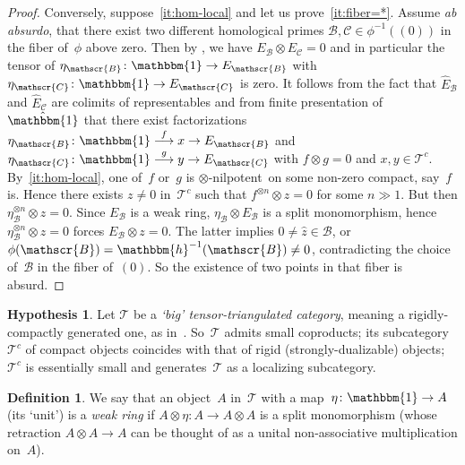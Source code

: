 \documentclass[10pt,a4paper]{article}
\def\To#1{\mathchoice{\xrightarrow{\textstyle\kern4pt#1\kern3pt}}{\stackrel{#1}{\longrightarrow}}{}{}}
\numberwithin{equation}{section}
\theoremstyle{definition}
\newtheorem{Def}[equation]{Definition}
\newtheorem{Hyp}[equation]{Hypothesis}
\newcommand{\cat}[1]{\mathscr{#1}}
\newcommand{\inv}{^{-1}}
\let\xto\To
\newcommand{\unit}{\mathbbm{1}}
\newcommand{\ababs}{\textit{ab absurdo}}
\newcommand{\cB}{\cat{B}}
\newcommand{\cC}{\cat{C}}
\newcommand{\cT}{\cat{T}}
\newcommand{\EB}{E_{\cB}}
\newcommand{\EC}{E_{\cC}}
\newcommand{\hEB}{\hat E_{\cB}}
\newcommand{\hEC}{\hat E_{\cC}}
\newcommand{\hunit}{\hat\unit}
\newcommand{\potimes}[1]{^{\otimes #1}}
\newcommand{\tensnil}{$\otimes$\nobreakdash-nilpotent}
\newcommand{\yoneda}{\mathbbm{h}}
\begin{document}
\begin{proof}
Conversely, suppose~\eqref{it:hom-local} and let us prove~\eqref{it:fiber=*}. Assume \ababs, that there exist two different homological primes $\cB,\cC\in\phi\inv((0))$ in the fiber of~$\phi$ above zero. Then by \cite[Prop.\,5.3]{Balmer20a}, we have $\EB\otimes \EC=0$ and in particular the tensor of $\eta_\cB\colon \unit\to \EB$ with $\eta_\cC\colon \unit \to \EC$ is zero. It follows from the fact that $\hEB$ and $\hEC$ are colimits of representables and from finite presentation of~$\hunit$ that there exist factorizations $\eta_\cB\colon \unit\xto{f} x\to \EB$ and $\eta_\cC\colon \unit\xto{g} y\to \EC$ with $f\otimes g=0$ and $x,y\in\cT^c$. By~\eqref{it:hom-local}, one of~$f$ or~$g$ is \tensnil\ on some non-zero compact, say~$f$ is. Hence there exists $z\neq0$ in~$\cT^c$ such that $f\potimes{n}\otimes z=0$ for some $n\gg1$. But then $\eta_\cB\potimes{n}\otimes z=0$. Since $\EB$ is a weak ring, $\eta_\cB\otimes\EB$ is a split monomorphism, hence $\eta_\cB\potimes{n}\otimes z=0$ forces $\EB\otimes z=0$. The latter implies $0\neq\hat z\in \cB$, or $\phi(\cB)=\yoneda\inv(\cB)\neq 0$, contradicting the choice of~$\cB$ in the fiber of~$(0)$. So the existence of two points in that fiber is absurd.
\end{proof}

\begin{Hyp}
\label{Hyp:big-tt}
Let $\cT$ be a \emph{`big' tensor-triangulated category}, meaning a rigidly-compactly generated one, as in~\cite{BalmerFavi11}. So~$\cT$ admits small coproducts; its subcategory~$\cT^c$ of compact objects coincides with that of rigid (strongly-dualizable) objects; $\cT^c$ is essentially small and generates~$\cT$ as a localizing subcategory.
\end{Hyp}

\begin{Def}
\label{Def:weak-ring}
We say that an object~$A$ in~$\cT$ with a map~$\eta\colon \unit\to A$ (its `unit') is a \emph{weak ring} if $A\otimes\eta\colon A\to A\otimes A$ is a split monomorphism (whose retraction $A\otimes A\to A$ can be thought of as a unital non-associative multiplication on~$A$).
\end{Def}
\end{document}
